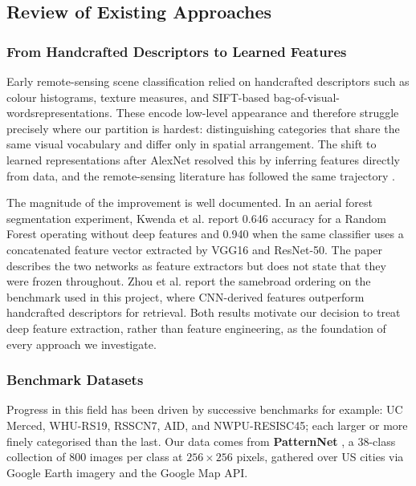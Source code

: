 \documentclass[11pt,twoside,a4paper]{article}
\begin{document}
\subsection{Review of Existing Approaches}
\label{sec:review}

\subsubsection{From Handcrafted Descriptors to Learned Features}

Early remote-sensing scene classification relied on handcrafted descriptors such as colour histograms, texture measures, and SIFT-based bag-of-visual-wordsrepresentations. These encode low-level appearance and therefore struggle precisely where our partition is hardest: distinguishing categories that share the same visual vocabulary and differ only in spatial arrangement. The shift to
learned representations after AlexNet \cite{Krizhevsky2012} resolved this by inferring features directly from data, and the remote-sensing literature has followed the same trajectory \cite{Zhu2017, Cheng2020}.

The magnitude of the improvement is well documented. In an aerial forest segmentation experiment, Kwenda et al. \cite{Kwenda2024} report 0.646 accuracy for a Random Forest operating without deep features and 0.940 when the same classifier uses a concatenated feature vector extracted by VGG16 and ResNet-50. The paper describes the two networks as feature extractors but does not state
that they were frozen throughout. Zhou et al. \cite{Zhou2018} report the samebroad ordering on the benchmark used in this project, where CNN-derived features outperform handcrafted descriptors for retrieval. Both results motivate our decision to treat deep feature extraction, rather than feature engineering, as the foundation of every approach we investigate.

\subsubsection{Benchmark Datasets}

Progress in this field has been driven by successive benchmarks for example: UC Merced,
WHU-RS19, RSSCN7, AID, and NWPU-RESISC45; each larger or more finely
categorised than the last. Our data comes from \textbf{PatternNet}
\cite{Zhou2018}, a 38-class collection of 800 images per class at
$256 \times 256$ pixels, gathered over US cities via Google Earth imagery and the Google Map API.
\end{document}
